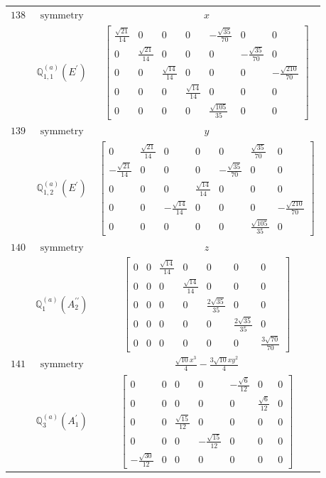 \documentclass[fleqn,8pt,landscape]{jsarticle}
\begin{document}
\begin{longtable}{ccc}
$ 138 $ & $ \text{symmetry} $ & $ x $ \\
$  $ & $ \mathbb{Q}_{1,1}^{(a)}(E^{\prime}) $ & $ \begin{bmatrix} \frac{\sqrt{21}}{14} & 0 & 0 & 0 & - \frac{\sqrt{35}}{70} & 0 & 0 \\ 0 & \frac{\sqrt{21}}{14} & 0 & 0 & 0 & - \frac{\sqrt{35}}{70} & 0 \\ 0 & 0 & \frac{\sqrt{14}}{14} & 0 & 0 & 0 & - \frac{\sqrt{210}}{70} \\ 0 & 0 & 0 & \frac{\sqrt{14}}{14} & 0 & 0 & 0 \\ 0 & 0 & 0 & 0 & \frac{\sqrt{105}}{35} & 0 & 0 \end{bmatrix} $ \\ \hline
$ 139 $ & $ \text{symmetry} $ & $ y $ \\
$  $ & $ \mathbb{Q}_{1,2}^{(a)}(E^{\prime}) $ & $ \begin{bmatrix} 0 & \frac{\sqrt{21}}{14} & 0 & 0 & 0 & \frac{\sqrt{35}}{70} & 0 \\ - \frac{\sqrt{21}}{14} & 0 & 0 & 0 & - \frac{\sqrt{35}}{70} & 0 & 0 \\ 0 & 0 & 0 & \frac{\sqrt{14}}{14} & 0 & 0 & 0 \\ 0 & 0 & - \frac{\sqrt{14}}{14} & 0 & 0 & 0 & - \frac{\sqrt{210}}{70} \\ 0 & 0 & 0 & 0 & 0 & \frac{\sqrt{105}}{35} & 0 \end{bmatrix} $ \\ \hline
$ 140 $ & $ \text{symmetry} $ & $ z $ \\
$  $ & $ \mathbb{Q}_{1}^{(a)}(A_{2}^{\prime\prime}) $ & $ \begin{bmatrix} 0 & 0 & \frac{\sqrt{14}}{14} & 0 & 0 & 0 & 0 \\ 0 & 0 & 0 & \frac{\sqrt{14}}{14} & 0 & 0 & 0 \\ 0 & 0 & 0 & 0 & \frac{2 \sqrt{35}}{35} & 0 & 0 \\ 0 & 0 & 0 & 0 & 0 & \frac{2 \sqrt{35}}{35} & 0 \\ 0 & 0 & 0 & 0 & 0 & 0 & \frac{3 \sqrt{70}}{70} \end{bmatrix} $ \\ \hline
$ 141 $ & $ \text{symmetry} $ & $ \frac{\sqrt{10} x^{3}}{4} - \frac{3 \sqrt{10} x y^{2}}{4} $ \\
$  $ & $ \mathbb{Q}_{3}^{(a)}(A_{1}^{\prime}) $ & $ \begin{bmatrix} 0 & 0 & 0 & 0 & - \frac{\sqrt{6}}{12} & 0 & 0 \\ 0 & 0 & 0 & 0 & 0 & \frac{\sqrt{6}}{12} & 0 \\ 0 & 0 & \frac{\sqrt{15}}{12} & 0 & 0 & 0 & 0 \\ 0 & 0 & 0 & - \frac{\sqrt{15}}{12} & 0 & 0 & 0 \\ - \frac{\sqrt{30}}{12} & 0 & 0 & 0 & 0 & 0 & 0 \end{bmatrix} $ \\ \hline

\end{longtable}
\end{document}
